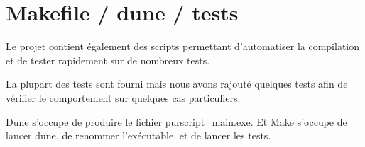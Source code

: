\documentclass[12pt,a4paper,french]{article}
\begin{document}
\part*{Makefile / dune / tests}
Le projet contient également des scripts permettant d'automatiser la compilation et de tester rapidement sur de nombreux tests.

La plupart des tests sont fourni mais nous avons rajouté quelques tests afin de vérifier le comportement sur quelques cas particuliers.

Dune s'occupe de produire le fichier purscript\_main.exe. Et Make s'occupe de lancer dune, de renommer l'exécutable, et de lancer les tests.
\end{document}
